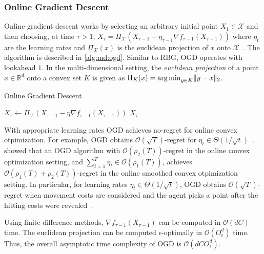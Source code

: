\subsubsection{Online Gradient Descent}

Online gradient descent works by selecting an arbitrary initial point $X_1 \in \mathcal{X}$ and then choosing, at time $\tau > 1$, $X_{\tau} = \Pi_{\mathcal{X}}(X_{\tau-1} - \eta_{\tau-1} \nabla f_{\tau-1}(X_{\tau-1}))$ where $\eta_t$ are the learning rates and $\Pi_{\mathcal{X}}(x)$ is the euclidean projection of $x$ onto $\mathcal{X}$~\cite{Andrew2015}. The algorithm is described in \cref{alg:md:ogd}. Similar to RBG, OGD operates with lookahead $1$. In the multi-dimensional setting, the \emph{euclidean projection} of a point $x \in \mathbb{R}^d$ onto a convex set $K$ is given as $\Pi_{K}(x) = \operatorname*{arg\,min}_{y \in K} \lVert y - x\rVert_2$.

\begin{algorithm}
    \caption{Online Gradient Descent~\cite{Andrew2015}}\label{alg:md:ogd}
    $X_{\tau} \gets \Pi_{\mathcal{X}}(X_{\tau-1} - \eta \nabla f_{\tau-1}(X_{\tau-1}))$\;
    \Return $X_{\tau}$\;
\end{algorithm}

With appropriate learning rates OGD achieves no-regret for online convex otpimization. For example, OGD obtains $\mathcal{O}(\sqrt{T})$-regret for $\eta_t \in \Theta(1 / \sqrt{t})$~\cite{Andrew2015}. \citeauthor{Andrew2015}~\cite{Andrew2015} showed that an OGD algorithm with $\mathcal{O}(\rho_2(T))$-regret in the online convex optimization setting, and $\sum_{t=1}^T \eta_t \in \mathcal{O}(\rho_1(T))$, achieves $\mathcal{O}(\rho_1(T) + \rho_2(T))$-regret in the online smoothed convex otpimization setting. In particular, for learning rates $\eta_t \in \Theta(1 / \sqrt{t})$, OGD obtains $\mathcal{O}(\sqrt{T})$-regret when movement costs are considered and the agent picks a point after the hitting costs were revealed~\cite{Andrew2015}.

Using finite difference methods, $\nabla f_{\tau-1}(X_{\tau-1})$ can be computed in $\mathcal{O}(d C)$ time. The euclidean projection can be computed $\epsilon$-optimally in $\mathcal{O}(O_{\epsilon}^d)$ time. Thus, the overall asymptotic time complexity of OGD is $\mathcal{O}(d C O_{\epsilon}^d)$.

